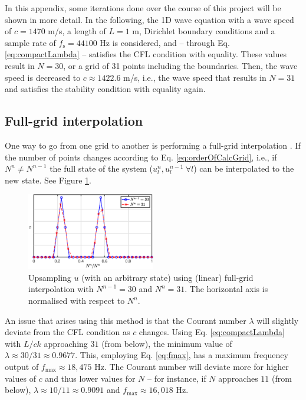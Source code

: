  In this appendix, some iterations done over the course of this project will be shown in more detail. In the following, the 1D wave equation with a wave speed of $c = 1470$ m/s, a length of $L = 1$ m, Dirichlet boundary conditions and a sample rate of $f_\text{s} = 44100$ Hz is considered, and -- through Eq. \eqref{eq:compactLambda} -- satisfies the CFL condition with equality. These values result in $N = 30$, or a grid of 31 points including the boundaries. Then, the wave speed is decreased to $c \approx 1422.6$ m/s, i.e., the wave speed that results in $N=31$ and satisfies the stability condition with equality again. 

\subsection{Full-grid interpolation}
One way to go from one grid to another is performing a full-grid interpolation \cite[Chap. 5]{theBible}. If the number of points changes according to Eq. \eqref{eq:orderOfCalcGrid}, i.e., if $N^n \neq N^{n-1}$ the full state of the system ($u_l^n, u_l^{n-1}\ \forall l$)  can be interpolated to the new state. See Figure \ref{fig:fullGrid}. 

\begin{figure}[ht]
    \centering

\includegraphics[width=0.5\textwidth]{figures/contributions/dynamicgrid/fullGrid.eps}
\caption{\label{fig:fullGrid}{Upsampling $u$ (with an arbitrary state) using (linear) full-grid interpolation with $N^{n-1} = 30$ and $N^n = 31$. The horizontal axis is normalised with respect to $N^n$.}}
\end{figure} 

An issue that arises using this method is that the Courant number $\lambda$ will slightly deviate from the CFL condition as $c$ changes. Using Eq. \eqref{eq:compactLambda} with $L/ck$ approaching $31$ (from below), the minimum value of $\lambda \approx 30/31 \approx 0.9677$.
This, employing Eq. \eqref{eq:fmax}, has a maximum frequency output of $f_\text{max} \approx 18,475$ Hz. 
The Courant number will deviate more for higher values of $c$ and thus lower values for $N$ -- for instance, if $N$ approaches $11$ (from below), $\lambda \approx 10/11 \approx 0.9091$ and $f_\text{max} \approx 16,018$ Hz.

